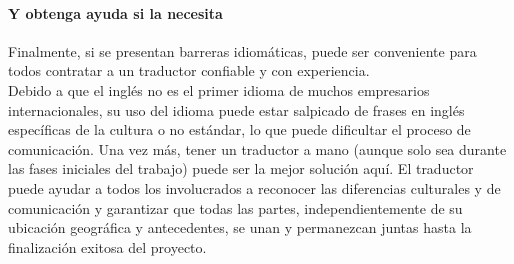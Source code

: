 \documentclass[10pt]{book}
\begin{document}
\paragraph{Y obtenga ayuda si la necesita}
Finalmente, si se presentan barreras idiomáticas, puede ser conveniente para todos contratar a un traductor confiable y con experiencia.\\
Debido a que el inglés no es el primer idioma de muchos empresarios internacionales, su uso del idioma puede estar salpicado de frases en inglés específicas de la cultura o no estándar, lo que puede dificultar el proceso de comunicación. Una vez más, tener un traductor a mano (aunque solo sea durante las fases iniciales del trabajo) puede ser la mejor solución aquí. El traductor puede ayudar a todos los involucrados a reconocer las diferencias culturales y de comunicación y garantizar que todas las partes, independientemente de su ubicación geográfica y antecedentes, se unan y permanezcan juntas hasta la finalización exitosa del proyecto.\\
\end{document}
